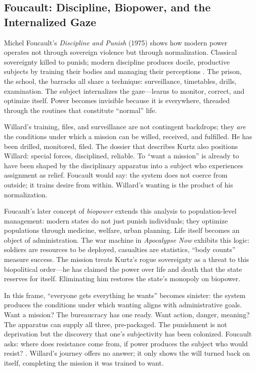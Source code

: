 \subsection*{Foucault: Discipline, Biopower, and the Internalized Gaze}
\label{ssec:v-foucault}
Michel Foucault's \textit{Discipline and Punish} (1975) shows how modern power operates not
through sovereign violence but through normalization. Classical sovereignty killed to punish;
modern discipline produces docile, productive subjects by training their bodies and managing
their perceptions \parencite{FoucaultDiscipline1995}. The prison, the school, the barracks all
share a technique: surveillance, timetables, drills, examination. The subject internalizes the
gaze---learns to monitor, correct, and optimize itself. Power becomes invisible because it is
everywhere, threaded through the routines that constitute ``normal'' life.

Willard's training, files, and surveillance are not contingent backdrops; they \emph{are} the
conditions under which a mission can be willed, received, and fulfilled. He has been drilled,
monitored, filed. The dossier that describes Kurtz also positions Willard: special forces,
disciplined, reliable. To ``want a mission'' is already to have been shaped by the disciplinary
apparatus into a subject who experiences assignment as relief. Foucault would say: the system
does not coerce from outside; it trains desire from within. Willard's wanting is the product of
his normalization.

Foucault's later concept of \emph{biopower} extends this analysis to population-level
management: modern states do not just punish individuals; they optimize populations through
medicine, welfare, urban planning. Life itself becomes an object of
administration. The war machine in \textit{Apocalypse Now} exhibits this logic: soldiers are
resources to be deployed, casualties are statistics, ``body counts'' measure success. The
mission treats Kurtz's rogue sovereignty as a threat to this biopolitical order---he has
claimed the power over life and death that the state reserves for itself. Eliminating him
restores the state's monopoly on biopower.

In this frame, ``everyone gets everything he wants'' becomes sinister: the system produces the
conditions under which wanting aligns with administrative goals. Want a mission? The bureaucracy
has one ready. Want action, danger, meaning? The apparatus can supply all three, pre-packaged.
The punishment is not deprivation but the discovery that one's subjectivity has been colonized.
Foucault asks: where does resistance come from, if power produces the subject who would resist?
\parencite{FoucaultDiscipline1995}. Willard's journey offers no answer; it only shows the will
turned back on itself, completing the mission it was trained to want.

